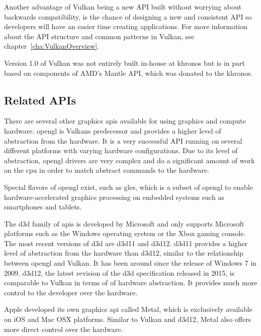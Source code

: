     Another advantage of Vulkan being a new API built without worrying about backwards compatibility, is the chance of designing a new and consistent API so developers will have an easier time creating applications.
    For more information about the API structure and common patterns in Vulkan, see chapter~\ref{cha:VulkanOverview}.

    Version 1.0 of Vulkan was not entirely built in-house at \gls{khronos} but is in part based on components of AMD's Mantle API, which was donated to the \gls{khronos}\cite{vksessiongdc15}.


    \subsection{Related APIs}
      There are several other graphics \glspl{api} available for using graphics and compute hardware.
      \gls{opengl} is Vulkans predecessor and provides a higher level of abstraction from the hardware.
      It is a very successful API running on several different platforms with varying hardware configurations.
      Due to its level of abstraction, \gls{opengl} drivers are very complex and do a significant amount of work on the \gls{cpu} in order to match abstract commands to the hardware.

      Special flavors of \gls{opengl} exist, such as \gls{gles}, which is a subset of \gls{opengl} to enable hardware-accelerated graphics processing on embedded systems such as smartphones and tablets.

      The \gls{d3d} family of \glspl{api} is developed by Microsoft and only supports Microsoft platforms such as the Windows operating system or the Xbox gaming console.
      The most recent versions of \gls{d3d} are \gls{d3d11} and \gls{d3d12}.
      \gls{d3d11} provides a higher level of abstraction from the hardware than \gls{d3d12}, similar to the relationship between \gls{opengl} and Vulkan.
      It has been around since the release of Windows 7 in 2009.
      \gls{d3d12}, the latest revision of the \gls{d3d} specification released in 2015, is comparable to Vulkan in terms of of hardware abstraction.
      It provides much more control to the developer over the hardware.

      Apple developed its own graphics \gls{api} called Metal, which is exclusively available on iOS and Mac OSX platforms.
      Similar to Vulkan and \gls{d3d12}, Metal also offers more direct control over the hardware.

